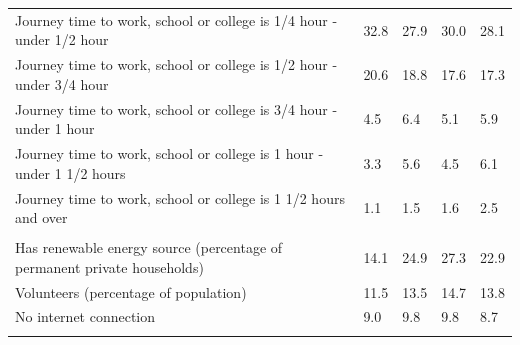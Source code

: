 \documentclass{article}
\begin{document}
\begin{table}[h]
\begin{tabular}{KTTTT}
Journey time to work, school or college is 1/4 hour - under 1/2 hour & 32.8& 27.9& 30.0& 28.1\\
Journey time to work, school or college is 1/2 hour - under 3/4 hour & 20.6& 18.8& 17.6& 17.3\\
Journey time to work, school or college is 3/4 hour - under 1 hour & 4.5& 6.4& 5.1& 5.9\\
Journey time to work, school or college is 1 hour - under 1 1/2 hours & 3.3& 5.6& 4.5& 6.1\\
Journey time to work, school or college is 1 1/2 hours and over & 1.1& 1.5& 1.6& 2.5\\
\hline
    \\ 
    \hline
Has renewable energy source (percentage of permanent private households) & 14.1& 24.9& 27.3& 22.9\\
    \hline
Volunteers (percentage of population) & 11.5& 13.5& 14.7& 13.8\\
    \hline
No internet connection& 9.0& 9.8& 9.8& 8.7\\
\hline
\end{tabular}
\end{table}
\end{document}
